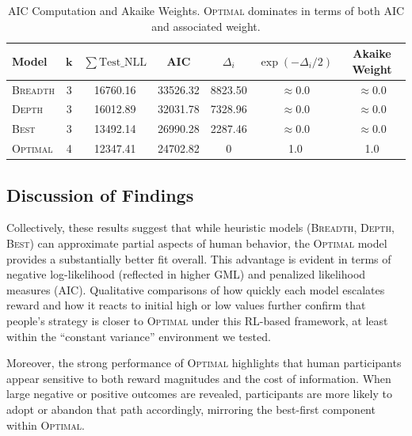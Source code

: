 \documentclass[a4paper,12pt,oneside,article]{memoir}
\begin{document}
\begin{table}[h]
    \centering
    \begin{tabular}{lcccccc}
    \toprule
    \textbf{Model}
      & \(\textbf{k}\) 
      & \(\sum \mathrm{Test\_NLL}\)
      & \textbf{AIC}
      & \(\Delta_i\)
      & \(\exp(-\Delta_i/2)\)
      & \textbf{Akaike Weight}\\
    \midrule
    \textsc{Breadth}
      & 3
      & 16760.16
      & 33526.32
      & 8823.50
      & \(\approx 0.0\)
      & \(\approx 0.0\)\\
    \textsc{Depth}
      & 3
      & 16012.89
      & 32031.78
      & 7328.96
      & \(\approx 0.0\)
      & \(\approx 0.0\)\\
    \textsc{Best}
      & 3
      & 13492.14
      & 26990.28
      & 2287.46
      & \(\approx 0.0\)
      & \(\approx 0.0\)\\
    \textsc{Optimal}
      & 4
      & 12347.41
      & 24702.82
      & 0
      & 1.0
      & 1.0 \\
    \bottomrule
    \end{tabular}
    \caption{AIC Computation and Akaike Weights. \textsc{Optimal} dominates in terms of both AIC and associated weight.}
    \label{tab:AIC}
\end{table}

\subsection*{Discussion of Findings}
Collectively, these results suggest that while heuristic models (\textsc{Breadth}, \textsc{Depth}, \textsc{Best}) can approximate partial aspects of human behavior, the \textsc{Optimal} model provides a substantially better fit overall. This advantage is evident in terms of negative log-likelihood (reflected in higher GML) and penalized likelihood measures (AIC). Qualitative comparisons of how quickly each model escalates reward and how it reacts to initial high or low values further confirm that people’s strategy is closer to \textsc{Optimal} under this RL-based framework, at least within the “constant variance” environment we tested.

Moreover, the strong performance of \textsc{Optimal} highlights that human participants appear sensitive to both reward magnitudes and the cost of information. When large negative or positive outcomes are revealed, participants are more likely to adopt or abandon that path accordingly, mirroring the best-first component within \textsc{Optimal}.
\end{document}
